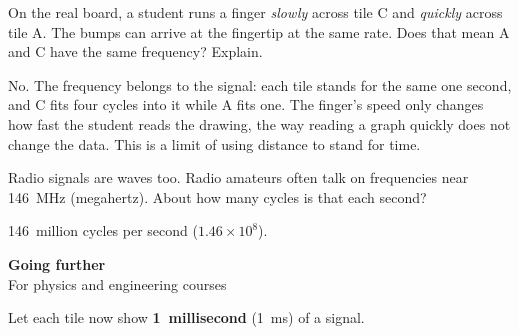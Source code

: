 \documentclass[11pt,addpoints]{exam}
\begin{document}
\begin{questions}
\question[3] On the real board, a student runs a finger \emph{slowly} across tile C and
\emph{quickly} across tile A. The bumps can arrive at the fingertip at the same rate. Does that
mean A and C have the same frequency? Explain.
\begin{solution}
No. The frequency belongs to the signal: each tile stands for the same one second, and C fits
four cycles into it while A fits one. The finger's speed only changes how fast the student reads
the drawing, the way reading a graph quickly does not change the data. This is a limit of using
distance to stand for time.
\end{solution}
\vspace{2.0cm}

\question[2] Radio signals are waves too. Radio amateurs often talk on frequencies near 146~MHz
(megahertz). About how many cycles is that each second?
\begin{solution}
146~million cycles per second (\(1.46\times10^{8}\)).
\end{solution}
\vspace{1.0cm}

\newpage
\begin{center}
{\Large\bfseries Going further}\\[2pt]
{\normalsize For physics and engineering courses}
\end{center}

\question Let each tile now show \textbf{1~millisecond} (\SI{1}{ms}) of a signal.


\end{questions}
\end{document}
